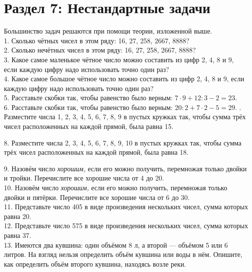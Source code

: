 \section{Раздел 7: Нестандартные задачи}
Большинство задач решаются при помощи теории, изложенной выше.\\
1. Сколько чётных чисел в этом ряду: 16, 27, 258, 2667, 8888?\\
2. Сколько нечётных чисел в этом ряду: 16, 27, 258, 2667, 8888?\\
3. Какое самое маленькое чётное число можно составить из цифр 2, 4, 8 и 9, если каждую цифру надо использовать точно один раз?\\
4. Какое самое большое чётное число можно составить из цифр 2, 4, 8 и 9, если каждую цифру надо использовать точно один раз?\\
5. Расставьте скобки так, чтобы равенство было верным: $7\cdot9+12:3-2=23.$\\
6. Расставьте скобки так, чтобы равенство было верным: $20:2+7\cdot2-5=29.$
\newpage
{}. Разместите числа 1, 2, 3, 4, 5, 6, 7, 8, 9 в пустых кружках так, чтобы сумма трёх чисел расположенных на каждой прямой, была равна 15.
\begin{center}
\begin{figure}[h!]
\end{figure}
\end{center}
8. Разместите числа 2, 3, 4, 5, 6, 7, 8, 9, 10 в пустых кружках так, чтобы сумма трёх чисел расположенных на каждой прямой, была равна 18.
\begin{center}
\begin{figure}[h!]
\end{figure}
\end{center}
9. Назовём число {\it хорошим,} если его можно получить, перемножая только двойки и тройки. Перечислите все хорошие числа от 4 до 20.\\
10. Назовём число {\it хорошим,} если его можно получить, перемножая только двойки и пятёрки. Перечислите все хорошие числа от 6 до 30.\\
11. Представьте число 405 в виде произведения нескольких чисел, сумма которых равна 20.\\
12. Представьте число 575 в виде произведения нескольких чисел, сумма которых равна 37.\\
13. Имеются два кувшина: один объёмом 8 л, а второй --- объёмом 5 или 6 литров. На взгляд нельзя определить объём кувшина или воды в нём. Опишите, как определить объём второго кувшина, находясь возле реки.\\
